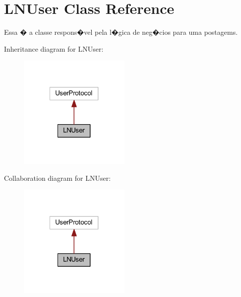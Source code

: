 \hypertarget{class_l_n_user}{\section{L\-N\-User Class Reference}
\label{class_l_n_user}
}


Essa � a classe respons�vel pela l�gica de neg�cios para uma postagems.  




Inheritance diagram for L\-N\-User\-:
\nopagebreak
\begin{figure}[H]
\begin{center}
\leavevmode
\includegraphics[width=152pt]{class_l_n_user__inherit__graph}
\end{center}
\end{figure}


Collaboration diagram for L\-N\-User\-:
\nopagebreak
\begin{figure}[H]
\begin{center}
\leavevmode
\includegraphics[width=152pt]{class_l_n_user__coll__graph}
\end{center}
\end{figure}
